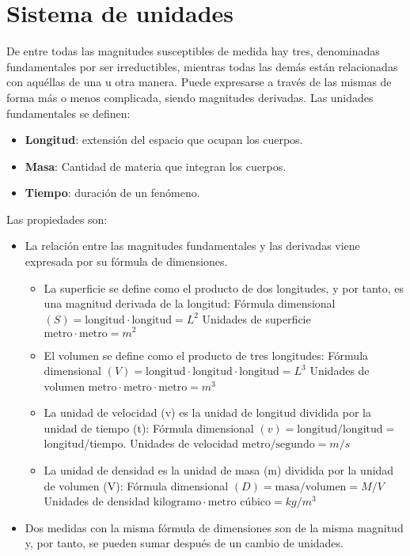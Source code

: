 \section{Sistema de unidades}
De entre todas las magnitudes susceptibles de medida hay tres, denominadas fundamentales por ser irreductibles, mientras todas las demás están relacionadas con aquéllas de una u otra manera. Puede expresarse a través de las mismas de forma más o menos complicada, siendo magnitudes derivadas. Las unidades fundamentales se definen:
\begin{itemize}[itemsep=0pt,parsep=0pt,topsep=0pt,partopsep=0pt]
    \item \textbf{Longitud}: extensión del espacio que ocupan los cuerpos.
    \item\textbf{Masa}: Cantidad de materia que integran los cuerpos.
    \item\textbf{Tiempo}: duración de un fenómeno.
\end{itemize}

Las propiedades son:
\begin{itemize}[itemsep=0pt,parsep=0pt,topsep=0pt,partopsep=0pt]
    \item La relación entre las magnitudes fundamentales y las derivadas viene expresada por su fórmula de dimensiones.
    \begin{itemize}[itemsep=0pt,parsep=0pt,topsep=0pt,partopsep=0pt]
        \item La superficie se define como el producto de dos longitudes, y por tanto, es una magnitud derivada de la longitud:
            \subitem Fórmula dimensional $(S) = \mbox{longitud} \cdot \mbox{longitud} = L^2$
            \subitem Unidades de superficie $\mbox{metro} \cdot \mbox{metro} = m^2$
        \item El volumen se define como el producto de tres longitudes:
            \subitem Fórmula dimensional $(V) = \mbox{longitud} \cdot \mbox{longitud} \cdot \mbox{longitud} = L^3$
            \subitem Unidades de volumen $\mbox{metro} \cdot \mbox{metro} \cdot \mbox{metro} = m^3$
        \item La unidad de velocidad (v) es la unidad de longitud dividida por la unidad de tiempo (t):
            \subitem Fórmula dimensional $(v) = \mbox{longitud} / \mbox{longitud} =$ longitud/tiempo.
            \subitem Unidades de velocidad $\mbox{metro} / \mbox{segundo} = m/s$
        \item La unidad de densidad es la unidad de masa (m) dividida por la unidad de volumen (V):
            \subitem Fórmula dimensional $(D) =  \mbox{masa} / \mbox{volumen} = M/V$
            \subitem Unidades de densidad $\mbox{kilogramo} \cdot \mbox{metro cúbico} = kg/m^3$
    \end{itemize}
    \item Dos medidas con la misma fórmula de dimensiones son de la misma magnitud y, por tanto, se pueden sumar después de un cambio de unidades.
\end{itemize}
